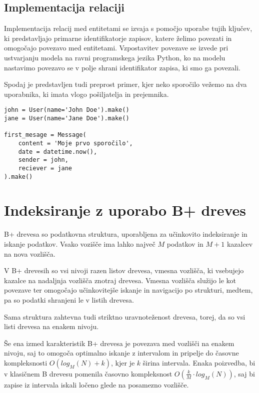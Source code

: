 \documentclass[a4paper,12pt,openright]{book}
\begin{document}
        \subsection{Implementacija relaciji}

        Implementacija relacij med entitetami se izvaja s pomočjo uporabe tujih ključev, ki predstavljajo primarne identifikatorje zapisov, katere želimo povezati in omogočajo povezavo med entitetami. Vzpostavitev povezave se izvede pri ustvarjanju modela na ravni programskega jezika Python, ko na modelu nastavimo povezavo se v polje shrani identifikator zapisa, ki smo ga povezali.

        Spodaj je predstavljen tudi preprost primer, kjer neko sporočilo vežemo na dva uporabnika, ki imata vlogo pošiljatelja in prejemnika.
\begin{verbatim}
john = User(name='John Doe').make()
jane = User(name='Jane Doe').make()

first_mesage = Message(
    content = 'Moje prvo sporočilo',
    date = datetime.now(),
    sender = john,
    reciever = jane
).make()
\end{verbatim}

    \section{Indeksiranje z uporabo B+ dreves}

        B+ drevesa so podatkovna struktura, uporabljena za učinkovito indeksiranje in iskanje podatkov. Vsako vozišče ima lahko največ $M$ podatkov in $M+1$ kazalcev na nova vozlišča.

        V B+ drevesih so vsi nivoji razen listov drevesa, vmesna vozlišča, ki vsebujejo kazalce na nadaljnja vozlišča znotraj drevesa. Vmesna vozlišča služijo le kot povezave ter omogočajo učinkovitejše iskanje in navigacijo po strukturi, medtem, pa so podatki shranjeni le v listih drevesa.

        Sama struktura zahtevna tudi striktno uravnoteženost drevesa, torej, da so vsi listi drevesa na enakem nivoju.

        Še ena izmed karakteristik B+ drevesa je povezava med vozlišči na enakem nivoju, saj to omogoča optimalno iskanje z intervalom in pripelje do časovne kompleksnosti $O(log_M(N) + k)$, kjer je $k$ širina intervala. Enaka poizvedba, bi v klasičnem B drevesu pomenila časovno kompleksnost $O(\frac{k}{M} \cdot log_M(N))$, saj bi zapise iz intervala iskali ločeno glede na posamezno vozlišče.
\end{document}
